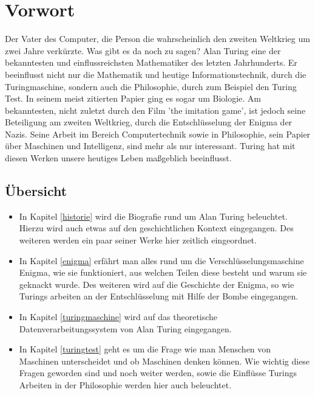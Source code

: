 \section{Vorwort}
Der Vater des Computer, die Person die wahrscheinlich den zweiten Weltkrieg um zwei Jahre verkürzte. Was gibt es da noch zu sagen? Alan Turing eine der bekanntesten und einflussreichsten Mathematiker des letzten Jahrhunderts. Er beeinflusst nicht nur die Mathematik und heutige Informationstechnik, durch die Turingmaschine, sondern auch die Philosophie, durch zum Beispiel den Turing Test. In seinem meist zitierten Papier ging es sogar um Biologie. Am bekanntesten, nicht zuletzt durch den Film 'the imitation game', ist jedoch seine Beteiligung am zweiten Weltkrieg, durch die Entschlüsselung der Enigma der Nazis. Seine Arbeit im Bereich Computertechnik sowie in Philosophie, sein Papier über Maschinen und Intelligenz, sind mehr als nur interessant. Turing hat mit diesen Werken unsere heutiges Leben maßgeblich beeinflusst.

\subsection{Übersicht}
\begin{itemize}
\item In Kapitel \ref{historie} wird die Biografie rund um Alan Turing beleuchtet. Hierzu wird auch etwas auf den geschichtlichen Kontext eingegangen. Des weiteren werden ein paar seiner Werke hier zeitlich eingeordnet.
\item In Kapitel \ref{enigma} erfährt man alles rund um die Verschlüsselungsmaschine Enigma, wie sie funktioniert, aus welchen Teilen diese besteht und warum sie geknackt wurde. Des weiteren wird auf die Geschichte der Enigma, so wie Turings arbeiten an der Entschlüsselung mit Hilfe der Bombe eingegangen.
\item In Kapitel \ref{turingmaschine} wird auf das theoretische Datenverarbeitungssystem von Alan Turing eingegangen.
\item In Kapitel \ref{turingtest} geht es um die Frage wie man Menschen von Maschinen unterscheidet und ob Maschinen denken können. Wie wichtig diese Fragen geworden sind und noch weiter werden, sowie die Einflüsse Turings Arbeiten in der Philosophie werden hier auch beleuchtet.
\end{itemize}